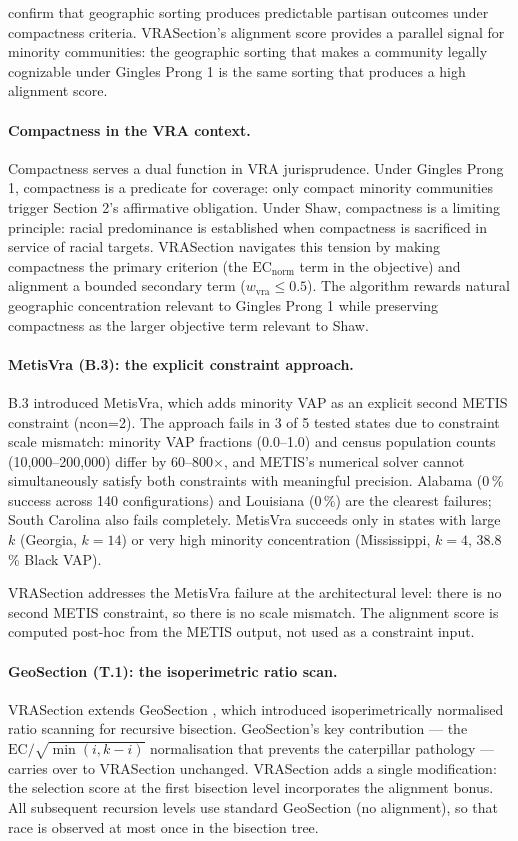 \citet{chen2013} confirm that geographic sorting produces predictable
partisan outcomes under compactness criteria.
VRASection's alignment score provides a parallel signal for minority
communities: the geographic sorting that makes a community legally cognizable
under Gingles Prong 1 is the same sorting that produces a high alignment score.

\paragraph{Compactness in the VRA context.}
Compactness serves a dual function in VRA jurisprudence.
Under Gingles Prong 1, compactness is a predicate for coverage: only
compact minority communities trigger Section 2's affirmative obligation.
Under Shaw, compactness is a limiting principle: racial predominance is
established when compactness is sacrificed in service of racial targets.
VRASection navigates this tension by making compactness the primary criterion
(the $\mathrm{EC}_\text{norm}$ term in the objective) and alignment a bounded
secondary term ($w_\text{vra} \leq 0.5$).
The algorithm rewards natural geographic concentration relevant to Gingles
Prong 1 while preserving compactness as the larger objective term relevant to
Shaw.

\paragraph{MetisVra (B.3): the explicit constraint approach.}
B.3 \citep{b3paper} introduced MetisVra, which adds minority VAP as an
explicit second METIS constraint (ncon=2).
The approach fails in 3 of 5 tested states due to constraint scale mismatch:
minority VAP fractions (0.0--1.0) and census population counts
(10,000--200,000) differ by 60--800$\times$, and METIS's numerical solver
cannot simultaneously satisfy both constraints with meaningful precision.
Alabama (0\,\% success across 140 configurations) and Louisiana (0\,\%)
are the clearest failures; South Carolina also fails completely.
MetisVra succeeds only in states with large $k$ (Georgia, $k=14$) or
very high minority concentration (Mississippi, $k=4$, 38.8\,\% Black VAP).

VRASection addresses the MetisVra failure at the architectural level:
there is no second METIS constraint, so there is no scale mismatch.
The alignment score is computed post-hoc from the METIS output, not
used as a constraint input.

\paragraph{GeoSection (T.1): the isoperimetric ratio scan.}
VRASection extends GeoSection \citep{b8paper}, which introduced
isoperimetrically normalised ratio scanning for recursive bisection.
GeoSection's key contribution --- the $\mathrm{EC}/\sqrt{\min(i,k-i)}$
normalisation that prevents the caterpillar pathology --- carries over
to VRASection unchanged.
VRASection adds a single modification: the selection score at the first
bisection level incorporates the alignment bonus.
All subsequent recursion levels use standard GeoSection (no alignment),
so that race is observed at most once in the bisection tree.
